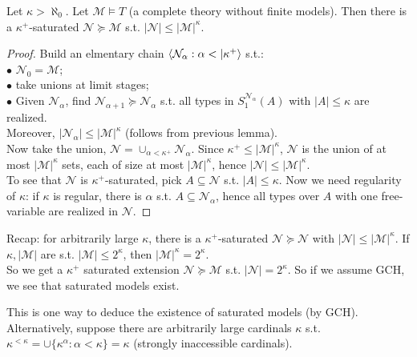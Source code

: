 \documentclass[a4paper]{article}
\begin{document}
\begin{thm}
    Let $\kappa > \aleph_0$. Let $\mathcal{M} \vDash T$ (a complete theory without finite models). Then there is a $\kappa^+$-saturated $\mathcal{N} \succcurlyeq \mathcal{M}$ s.t. $|\mathcal{N}| \leq |\mathcal{M}|^\kappa$.
    \begin{proof}
        Build an elmentary chain $\bra \mathcal{N}_\alpha:\alpha<|\kappa^+\ket$ s.t.:\\
        $\bullet$ $\mathcal{N}_0 = \mathcal{M}$;\\
        $\bullet$ take unions at limit stages;\\
        $\bullet$ Given $\mathcal{N}_\alpha$, find $\mathcal{N}_{\alpha+1} \succcurlyeq \mathcal{N}_\alpha$ s.t. all types in $S_1^{\mathcal{N}_\alpha}(A)$ with $|A| \leq \kappa$ are realized.\\
        Moreover, $|\mathcal{N}_\alpha| \leq |\mathcal{M}|^\kappa$ (follows from previous lemma).\\
        Now take the union, $\mathcal{N} = \cup_{\alpha < \kappa^+} \mathcal{N}_\alpha$. Since $\kappa^+ \leq |\mathcal{M}|^\kappa$, $\mathcal{N}$ is the union of at most $|\mathcal{M}|^\kappa$ sets, each of size at most $|\mathcal{M}|^\kappa$, hence $|\mathcal{N}| \leq |\mathcal{M}|^\kappa$.\\
        To see that $\mathcal{N}$ is $\kappa^+$-saturated, pick $A \subseteq \mathcal{N}$ s.t. $|A|\leq \kappa$. Now we need regularity of $\kappa$: if $\kappa$ is regular, there is $\alpha$ s.t. $A \subseteq \mathcal{N}_\alpha$, hence all types over $A$ with one free-variable are realized in $\mathcal{N}$.
    \end{proof}
\end{thm}

Recap: for arbitrarily large $\kappa$, there is a $\kappa^+$-saturated $\mathcal{N} \succcurlyeq \mathcal{N}$ with $|\mathcal{N}| \leq |\mathcal{M}|^\kappa$. If $\kappa, |\mathcal{M}|$ are s.t. $|\mathcal{M}| \leq 2^\kappa$, then $|\mathcal{M}|^\kappa = 2^\kappa$.\\
So we get a $\kappa^+$ saturated extension $\mathcal{N} \succcurlyeq \mathcal{M}$ s.t. $|\mathcal{N}| = 2^\kappa$. So if we assume GCH, we see that saturated models exist.

This is one way to deduce the existence of saturated models (by GCH). Alternatively, suppose there are arbitrarily large cardinals $\kappa$ s.t. $\kappa^{<\kappa} =\cup\{\kappa^\alpha:\alpha<\kappa\} = \kappa$ (strongly inaccessible cardinals).
\end{document}
